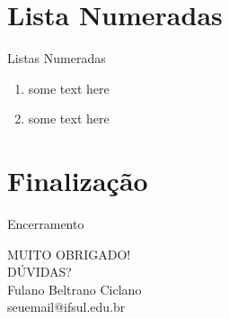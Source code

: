 \documentclass{beamer}
\begin{document}
\section{Lista Numeradas}
\begin{frame}{Listas Numeradas}
\begin{enumerate}
\item some text here
\item some text here
\end{enumerate}
\end{frame}

\section{Finalização}
\begin{frame}{Encerramento}
\begin{center}
{\huge MUITO OBRIGADO!\\\vspace*{0.5cm}DÚVIDAS?}\\\vspace*{2.5cm}
{\large Fulano Beltrano Ciclano\\\vspace*{0.3cm}seuemail@ifsul.edu.br}
\end{center}
\end{frame}
\end{document}
